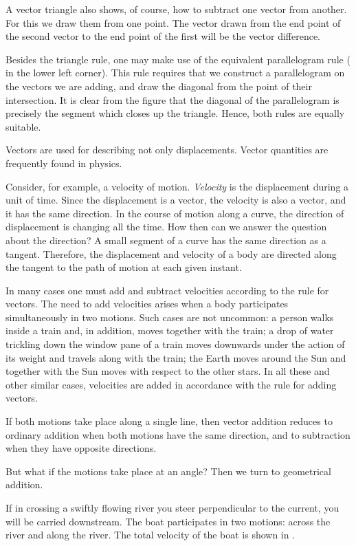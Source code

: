 A vector triangle also shows, of course, how to subtract one vector
from another. For this we draw them from one point. The vector drawn
from the end point of the second vector to the end point of the first
will be the vector difference.  

Besides the triangle rule, one may make use of the equivalent
parallelogram rule ( in the
lower left corner). This rule requires that we construct a
parallelogram on the vectors we are adding, and draw the diagonal from
the point of their intersection. It is clear from the figure that the
diagonal of the parallelogram is precisely the segment which closes up
the triangle. Hence, both rules are equally suitable.  

Vectors are used for describing not only displacements.  Vector
quantities are frequently found in physics.

Consider, for example, a velocity of motion. \emph{Velocity} is the
displacement during a unit of time. Since the displacement is a
vector, the velocity is also a vector, and it has the same
direction. In the course of motion along a curve, the direction of
displacement is changing all the time. How then can we answer the
question about the direction? A small segment of a curve has the same
direction as a tangent. Therefore, the displacement and velocity of a
body are directed along the tangent to the path of motion at each
given instant.  

In many cases one must add and subtract velocities
according to the rule for vectors. The need to add velocities arises
when a body participates simultaneously in two motions. Such cases are
not uncommon: a person walks inside a train and, in addition, moves
together with the train; a drop of water trickling down the window
pane of a train moves downwards under the action of its weight and
travels along with the train; the Earth moves around the Sun and
together with the Sun moves with respect to the other stars. In all
these and other similar cases, velocities are added in accordance with
the rule for adding vectors.

If both motions take place along a single line, then vector addition
reduces to ordinary addition when both motions have the same
direction, and to subtraction when they have opposite directions.  

But what if the motions take place at an angle? Then we turn to
geometrical addition.

If in crossing a swiftly flowing river you steer perpendicular to the
current, you will be carried downstream.  The boat participates in two
motions: across the river and along the river. The total velocity of
the boat is shown in .  

